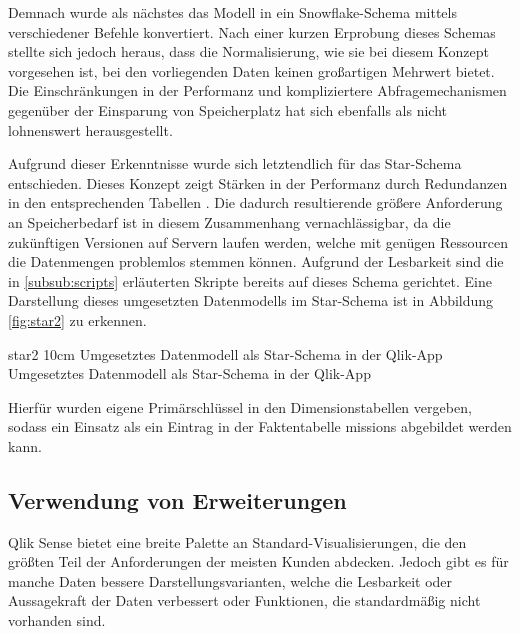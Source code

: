 
Demnach wurde als nächstes das Modell in ein Snowflake-Schema mittels verschiedener Befehle konvertiert. 
Nach einer kurzen Erprobung dieses Schemas stellte sich jedoch heraus, dass die Normalisierung, wie sie bei diesem Konzept vorgesehen ist, bei den vorliegenden Daten keinen großartigen Mehrwert bietet.
Die Einschränkungen in der Performanz und kompliziertere Abfragemechanismen gegenüber der Einsparung von Speicherplatz hat sich ebenfalls als nicht lohnenswert herausgestellt.

Aufgrund dieser Erkenntnisse wurde sich letztendlich für das Star-Schema entschieden.
Dieses Konzept zeigt Stärken in der Performanz durch Redundanzen in den entsprechenden Tabellen \cite[6.1]{Bauer.2004}. 
Die dadurch resultierende größere Anforderung an Speicherbedarf ist in diesem Zusammenhang vernachlässigbar, da die zukünftigen Versionen auf Servern laufen werden, welche mit genügen Ressourcen die Datenmengen problemlos stemmen können.
Aufgrund der Lesbarkeit sind die in \ref{subsub:scripts} erläuterten Skripte bereits auf dieses Schema gerichtet. 
Eine Darstellung dieses umgesetzten Datenmodells im Star-Schema ist in Abbildung \ref{fig:star2} zu erkennen.

\bild
{star2}
{10cm}
{Umgesetztes Datenmodell als Star-Schema in der Qlik-App}
{Umgesetztes Datenmodell als Star-Schema in der Qlik-App}

Hierfür wurden eigene Primärschlüssel in den Dimensionstabellen vergeben, sodass ein Einsatz als ein Eintrag in der Faktentabelle \glqq missions\grqq{} abgebildet werden kann.

\subsection{Verwendung von Erweiterungen}
\label{sub:extension}
Qlik Sense bietet eine breite Palette an Standard-Visualisierungen, die den größten Teil der Anforderungen der meisten Kunden abdecken.
Jedoch gibt es für manche Daten bessere Darstellungsvarianten, welche die Lesbarkeit oder Aussagekraft der Daten verbessert oder Funktionen, die standardmäßig nicht vorhanden sind.

